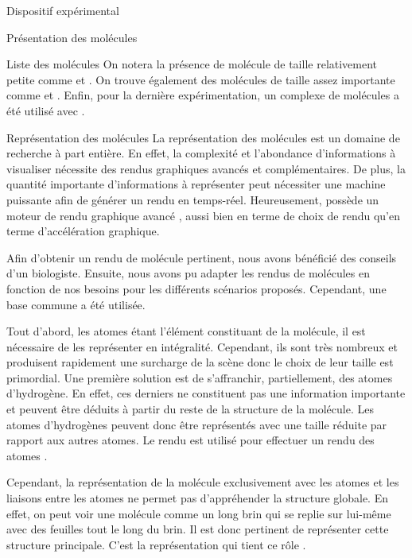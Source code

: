 \documentclass[myfrancais]{mythesis}
\begin{document}
\begin{mychapter}{Dispositif expérimental}
\begin{mysection}{Présentation des molécules}
\begin{mysubsection}{Liste des molécules}
				On notera la présence de molécule de taille relativement petite comme \myTRPZIPPER et \myTRPCAGE.
				On trouve également des molécules de taille assez importante comme \myPrion et \myUbiquitin.
				Enfin, pour la dernière expérimentation, un complexe de molécules a été utilisé avec \myNusENusG.
			\end{mysubsection}
			\begin{mysubsection}{Représentation des molécules}
				La représentation des molécules est un domaine de recherche à part entière.
				En effet, la complexité et l'abondance d'informations à visualiser nécessite des rendus graphiques avancés et complémentaires.
				De plus, la quantité importante d'informations à représenter peut nécessiter une machine puissante afin de générer un rendu en temps-réel.
				Heureusement,  possède un moteur de rendu graphique avancé , aussi bien en terme de choix de rendu qu'en terme d'accélération graphique.

				Afin d'obtenir un rendu de molécule pertinent, nous avons bénéficié des conseils d'un biologiste.
				Ensuite, nous avons pu adapter les rendus de molécules en fonction de nos besoins pour les différents scénarios proposés.
				Cependant, une base commune a été utilisée.

				Tout d'abord, les atomes étant l'élément constituant de la molécule, il est nécessaire de les représenter en intégralité.
				Cependant, ils sont très nombreux et produisent rapidement une surcharge de la scène donc le choix de leur taille est primordial.
				Une première solution est de s'affranchir, partiellement, des atomes d'hydrogène.
				En effet, ces derniers ne constituent pas une information importante et peuvent être déduits à partir du reste de la structure de la molécule.
				Les atomes d'hydrogènes peuvent donc être représentés avec une taille réduite par rapport aux autres atomes.
				Le rendu \myCPK est utilisé pour effectuer un rendu des atomes .

				\begin{myfigure}
				\end{myfigure}

				Cependant, la représentation de la molécule exclusivement avec les atomes et les liaisons entre les atomes ne permet pas d'appréhender la structure globale.
				En effet, on peut voir une molécule comme un long brin qui se replie sur lui-même avec des feuilles tout le long du brin.
				Il est donc pertinent de représenter cette structure principale.
				C'est la représentation \myNewRibbon qui tient ce rôle .


\end{mysubsection}
\end{mysection}
\end{mychapter}
\end{document}
